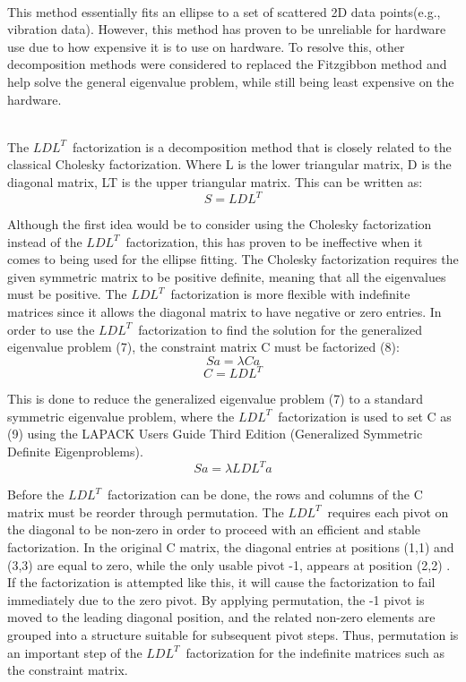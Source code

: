 \\This method essentially fits an ellipse to a set of scattered 2D data points(e.g., vibration data). However, this method has proven to be unreliable for hardware use due to how expensive it is to use on hardware. To resolve this, other decomposition methods were considered to replaced the Fitzgibbon method and help solve the general eigenvalue problem, while still being least expensive on the hardware.  

\\The $LDL^{T}\,$ factorization is a decomposition method that is closely related to the classical Cholesky factorization. Where L is the lower triangular matrix, D is the diagonal matrix, LT is the upper triangular matrix. This can be written as: 
\begin{equation}
    S = LDL^{T}
\end{equation}

Although the first idea would be to consider using the Cholesky factorization instead of the $LDL^{T}\,$ factorization, this has proven to be ineffective when it comes to being used for the ellipse fitting. The Cholesky factorization requires the given symmetric matrix to be positive definite, meaning that all the eigenvalues must be positive. The $LDL^{T}\,$ factorization is more flexible with indefinite matrices since it allows the diagonal matrix to have negative or zero entries. 
In order to use the $LDL^{T}\,$ factorization  to find the solution for the generalized eigenvalue problem (7), the constraint matrix C must be factorized (8):
\begin{equation}
    Sa = \lambda Ca
\end{equation}
\begin{equation}
    C = LDL^{T}
\end{equation}

This is done to reduce the generalized eigenvalue problem (7) to a standard symmetric eigenvalue problem, where the $LDL^{T}\,$ factorization is used to set C as (9) using the LAPACK Users Guide Third Edition (Generalized Symmetric Definite Eigenproblems).
\begin{equation}
    Sa = \lambda LDL^{T}a
\end{equation}

Before the $LDL^{T}\,$ factorization can be done, the rows and columns of the C matrix must be reorder through permutation. The $LDL^{T}\,$ requires each pivot on the diagonal to be non-zero in order to proceed with an efficient and stable factorization. In the original C matrix, the diagonal entries at positions (1,1) and (3,3) are equal to zero, while the only usable pivot -1, appears at position (2,2) . If the factorization is attempted like this, it will cause the factorization to fail immediately due to the zero pivot. By applying permutation, the -1 pivot is moved to the leading diagonal position, and the related non-zero elements are grouped into a structure suitable for subsequent pivot steps. Thus, permutation is an important step of the $LDL^{T}\,$ factorization for the indefinite matrices such as the constraint matrix. 

